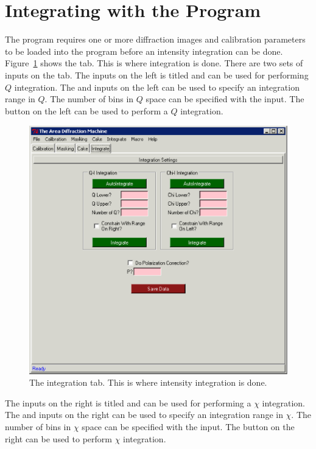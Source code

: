 \section{Integrating with the Program}

The program requires one or more diffraction images and
calibration parameters to be loaded into the program
before an intensity integration can be done.
Figure~\ref{integration_tab} shows the
 tab. This is where integration is done.
There are two sets of inputs on the tab. 
The inputs on the left is titled 
and can be used for performing $Q$ integration.
The  and  inputs on the left 
can be used to specify an integration range in $Q$.
The number of bins in $Q$ space can be specified with the
 input. The  button
on the left can be used to perform a $Q$ integration.

\begin{figure}
    \centering
    \includegraphics[scale=.75]{figures/integration_tab.eps}
    \caption{The integration tab. This is where intensity
    integration is done.} 
    \label{integration_tab}
\end{figure}

The inputs on the right is titled 
and can be used for performing a $\chi$ integration.
The  and  inputs on the right
can be used to specify an integration range in $\chi$.
The number of bins in $\chi$ space can be specified with the
 input. The  button
on the right can be used to perform $\chi$ integration.

